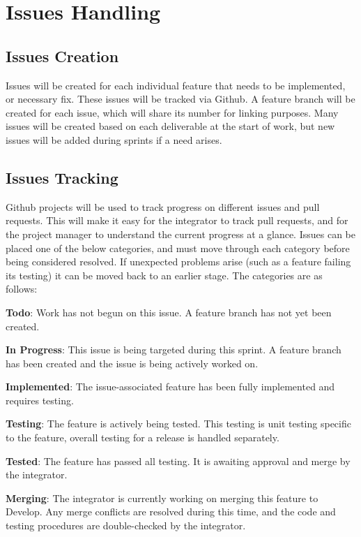 \section{Issues Handling} \label{section: issues handling}

\subsection{Issues Creation}

Issues will be created for each individual feature that needs to be implemented, or necessary fix. These issues will be tracked via Github. A feature branch will be created for each issue, which will share its number for linking purposes. Many issues will be created based on each deliverable at the start of work, but new issues will be added during sprints if a need arises.

\subsection{Issues Tracking}

Github projects will be used to track progress on different issues and pull requests. This will make it easy for the integrator to track pull requests, and for the project manager to understand the current progress at a glance. Issues can be placed one of the below categories, and must move through each category before being considered resolved. If unexpected problems arise (such as a feature failing its testing) it can be moved back to an earlier stage. The categories are as follows:

\textbf{Todo}: Work has not begun on this issue. A feature branch has not yet been created.

\textbf{In Progress}: This issue is being targeted during this sprint. A feature branch has been created and the issue is being actively worked on.

\textbf{Implemented}: The issue-associated feature has been fully implemented and requires testing.

\textbf{Testing}: The feature is actively being tested. This testing is unit testing specific to the feature, overall testing for a release is handled separately.

\textbf{Tested}: The feature has passed all testing. It is awaiting approval and merge by the integrator.

\textbf{Merging}: The integrator is currently working on merging this feature to Develop. Any merge conflicts are resolved during this time, and the code and testing procedures are double-checked by the integrator.


